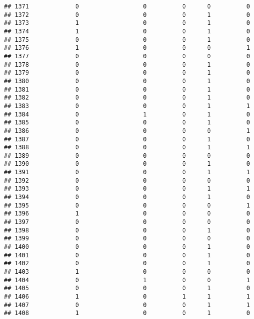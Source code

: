 \documentclass[
]{article}
\begin{document}
\begin{verbatim}
## 1371             0                  0          0      0          0
## 1372             0                  0          0      1          0
## 1373             1                  0          0      1          0
## 1374             1                  0          0      1          0
## 1375             0                  0          0      1          0
## 1376             1                  0          0      0          1
## 1377             0                  0          0      0          0
## 1378             0                  0          0      1          0
## 1379             0                  0          0      1          0
## 1380             0                  0          0      1          0
## 1381             0                  0          0      1          0
## 1382             0                  0          0      1          0
## 1383             0                  0          0      1          1
## 1384             0                  1          0      1          0
## 1385             0                  0          0      1          0
## 1386             0                  0          0      0          1
## 1387             0                  0          0      1          0
## 1388             0                  0          0      1          1
## 1389             0                  0          0      0          0
## 1390             0                  0          0      1          0
## 1391             0                  0          0      1          1
## 1392             0                  0          0      0          0
## 1393             0                  0          0      1          1
## 1394             0                  0          0      1          0
## 1395             0                  0          0      0          1
## 1396             1                  0          0      0          0
## 1397             0                  0          0      0          0
## 1398             0                  0          0      1          0
## 1399             0                  0          0      0          0
## 1400             0                  0          0      1          0
## 1401             0                  0          0      1          0
## 1402             0                  0          0      1          0
## 1403             1                  0          0      0          0
## 1404             0                  1          0      0          1
## 1405             0                  0          0      1          0
## 1406             1                  0          1      1          1
## 1407             0                  0          0      1          1
## 1408             1                  0          0      1          0

\end{verbatim}
\end{document}
